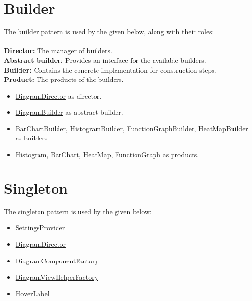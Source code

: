 \documentclass[10pt,a4paper]{report}
\newcommand{\refer}[2]{\hyperref[#1]{\textcolor{col:reference}{#2}}}
\newcommand{\packagebeginning}{edu.kit.informatik.pse.gelf} %
\newcommand{\lblroot}{lbl} %
\newcommand{\lblpackage}{} %
\newcommand{\lblpackageelement}{} %
\newcommand{\lblpackageelementmember}{} %
\newcommand{\lblpackageelementmemberparameter}{} %
\newcommand{\casclabelname}{\lblroot\lblpackage\lblpackageelement\lblpackageelementmember\lblpackageelementmemberparameter}
\newcommand{\casclabel}{\label{\casclabelname}}
\newcommand{\patternentry}[2]{
    #1{#2}
}
\newcommand{\pattern}[2]{
    \patternentry{\section}{#1}
    {#2}
}
\begin{document}
\pattern{Builder}{
    The builder pattern is used by the given below, along with their roles:
    \leavevmode \\ \leavevmode \\
    \textbf{Director:} The manager of builders. \leavevmode \\
    \textbf{Abstract builder:} Provides an interface for the available builders. \leavevmode \\
    \textbf{Builder:} Contains the concrete implementation for construction steps. \leavevmode \\
    \textbf{Product:} The products of the builders. \leavevmode \\
    \begin{itemize}
        \item \refer{\lblroot:view.diagrams:DiagramDirector}{DiagramDirector} as director.
        \item \refer{\lblroot:view.diagrams.builder:DiagramBuilder}{DiagramBuilder} as abstract builder.
        \item \refer{\lblroot:view.diagrams.builder:BarChartBuilder}{BarChartBuilder}, \refer{\lblroot:view.diagrams.builder:HistogramBuilder}{HistogramBuilder}, \refer{\lblroot:view.diagrams.builder:FunctionGraphBuilder}{FunctionGraphBuilder}, \refer{\lblroot:view.diagrams.builder:HeatMapBuilder}{HeatMapBuilder} as builders.
        \item \refer{\lblroot:view.diagrams.type:Histogram}{Histogram}, \refer{\lblroot:view.diagrams.type:BarChart}{BarChart}, \refer{\lblroot:view.diagrams.type:HeatMap}{HeatMap}, \refer{\lblroot:view.diagrams.type:FunctionGraph}{FunctionGraph} as products.
    \end{itemize}
}
\pattern{Singleton}{
    The singleton pattern is used by the given below:
    \leavevmode \\
    \begin{itemize}
        \item \refer{\lblroot:view.diagrams:SettingsProvider}{SettingsProvider}
        \item \refer{\lblroot:view.diagrams:DiagramDirector}{DiagramDirector}
        \item \refer{\lblroot:view.diagrams.components:DiagramComponentFactory}{DiagramComponentFactory}
        \item \refer{\lblroot:view.diagrams.indicator:DiagramViewHelperFactory}{DiagramViewHelperFactory}
        \item \refer{\lblroot:view.diagrams.components:HoverLabel}{HoverLabel}
    \end{itemize}
}
\end{document}
